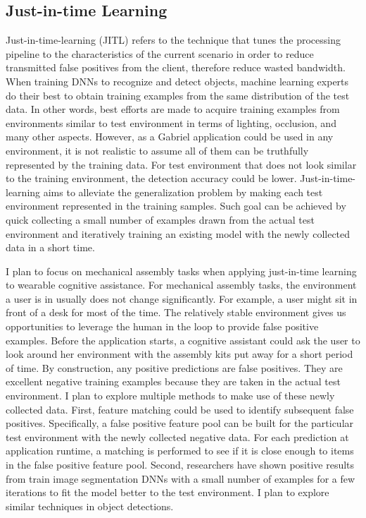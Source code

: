 \subsection{Just-in-time Learning}
Just-in-time-learning (JITL) refers to the technique that tunes the processing
pipeline to the characteristics of the current scenario in order to reduce
transmitted false positives from the client, therefore reduce wasted bandwidth.
When training DNNs to recognize and detect objects, machine learning experts do
their best to obtain training examples from the same distribution of the test
data. In other words, best efforts are made to acquire training examples from
environments similar to test environment in terms of lighting, occlusion, and
many other aspects. However, as a Gabriel application could be used in any
environment, it is not realistic to assume all of them can be truthfully
represented by the training data. For test environment that does not look
similar to the training environment, the detection accuracy could be lower.
Just-in-time-learning aims to alleviate the generalization problem by making
each test environment represented in the training samples. Such goal can be
achieved by quick collecting a small number of examples drawn from the actual
test environment and iteratively training an existing model with the newly
collected data in a short time.

I plan to focus on mechanical assembly tasks when applying just-in-time learning
to wearable cognitive assistance. For mechanical assembly tasks, the environment
a user is in usually does not change significantly. For example, a user might
sit in front of a desk for most of the time. The relatively stable environment gives
us opportunities to leverage the human in the loop to provide false positive
examples. Before the application starts, a cognitive assistant could ask the
user to look around her environment with the assembly kits put away for a short
period of time. By construction, any positive predictions are false positives.
They are excellent negative training examples because they are taken in the
actual test environment. I plan to explore multiple methods to make use of these
newly collected data. First, feature matching could be used to identify
subsequent false positives. Specifically, a false positive feature pool can be
built for the particular test environment with the newly collected negative
data. For each prediction at application runtime, a matching is performed to see
if it is close enough to items in the false positive feature pool. Second,
researchers have shown positive results from train image segmentation DNNs with
a small number of examples for a few iterations to fit the model better to the
test environment. I plan to explore similar techniques in object detections.

